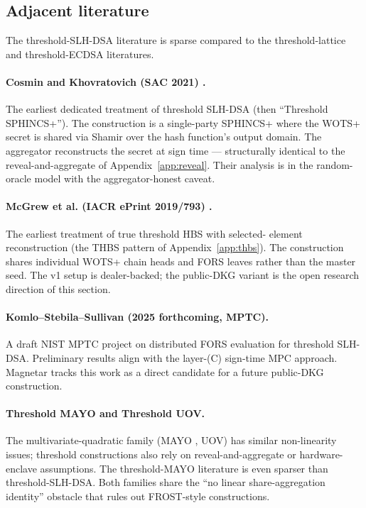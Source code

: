 \subsection{Adjacent literature}
\label{sec:fullmpc:litreview}

The threshold-SLH-DSA literature is sparse compared to the
threshold-lattice and threshold-ECDSA literatures.

\paragraph{Cosmin and Khovratovich (SAC 2021) \cite{cosmin2021}.}
The earliest dedicated treatment of threshold SLH-DSA (then
``Threshold SPHINCS+''). The construction is a single-party
SPHINCS+ where the WOTS+ secret is shared via Shamir over the
hash function's output domain. The aggregator reconstructs the
secret at sign time --- structurally identical to the
reveal-and-aggregate of Appendix~\ref{app:reveal}. Their analysis
is in the random-oracle model with the aggregator-honest caveat.

\paragraph{McGrew et al. (IACR ePrint 2019/793) \cite{mcgrew2019}.}
The earliest treatment of true threshold HBS with selected-
element reconstruction (the THBS pattern of
Appendix~\ref{app:thbs}). The construction shares individual
WOTS+ chain heads and FORS leaves rather than the master seed.
The v1 setup is dealer-backed; the public-DKG variant is the
open research direction of this section.

\paragraph{Komlo--Stebila--Sullivan (2025 forthcoming, MPTC).}
A draft NIST MPTC project on distributed FORS evaluation for
threshold SLH-DSA. Preliminary results align with the layer-(C)
sign-time MPC approach. Magnetar tracks this work as a direct
candidate for a future public-DKG construction.

\paragraph{Threshold MAYO and Threshold UOV.} The
multivariate-quadratic family (MAYO \cite{mayo}, UOV) has
similar non-linearity issues; threshold constructions
\cite{thresholduov} also rely on reveal-and-aggregate or
hardware-enclave assumptions. The threshold-MAYO literature is
even sparser than threshold-SLH-DSA. Both families share the
``no linear share-aggregation identity'' obstacle that rules out
FROST-style constructions.


